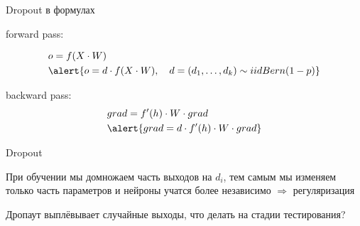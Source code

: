 \documentclass[notes,12pt, aspectratio=169]{beamer}
\newenvironment{wideitemize}{\itemize\addtolength{\itemsep}{10pt}}{\enditemize}
\begin{document}
\begin{frame}{Dropout в формулах} 
	\begin{wideitemize}
		\item forward pass:
		
		\begin{equation*}
			\begin{aligned}
				& o = f(X \cdot W  ) \\
				& \alert{o = d \cdot f(X \cdot W ), \quad  d = (d_1, \ldots, d_k) \sim iid \vspace{10mm} Bern(1 - p)} 
			\end{aligned}
		\end{equation*}
		
		\item backward pass:
		\begin{equation*}
			\begin{aligned}
				& grad = f'(h) \cdot W \cdot grad  \\
				& \alert{ grad =  d \cdot f'(h) \cdot W \cdot grad} 
			\end{aligned}
		\end{equation*}			
	\end{wideitemize}
\end{frame}


\begin{frame}{Dropout}
	\begin{wideitemize}
		\item  При обучении мы домножаем часть выходов на $d_i$, тем самым мы изменяем только часть параметров и нейроны учатся более независимо  \alert{$\Rightarrow$ регуляризация}
		
		\item Дропаут выплёвывает случайные выходы,  \alert{ что делать на стадии тестирования?}
		
		
	\end{wideitemize}
\end{frame}
\end{document}
